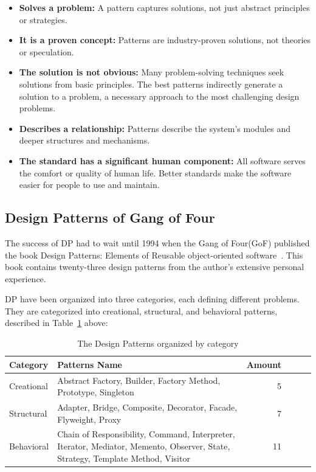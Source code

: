 \begin{itemize}
    \item \textbf{Solves a problem:} A pattern captures solutions, not just abstract principles or strategies.
    \item \textbf{It is a proven concept:} Patterns are industry-proven solutions, not theories or speculation.
    \item \textbf{The solution is not obvious:} Many problem-solving techniques seek solutions from basic principles. The best patterns indirectly generate a solution to a problem, a necessary approach to the most challenging design problems.
    \item \textbf{Describes a relationship:} Patterns describe the system's modules and deeper structures and mechanisms.
    \item \textbf{The standard has a significant human component:} All software serves the comfort or quality of human life. Better standards make the software easier for people to use and maintain. 
\end{itemize}


\subsection{Design Patterns of Gang of Four}\label{sec:gof}
The success of \ac{DP} had to wait until 1994 when the Gang of Four(GoF) published the book Design Patterns: Elements of Reusable object-oriented software~\cite{Gamma1994}. This book contains twenty-three design patterns from the author's extensive personal experience.
 
\ac{DP} have been organized into three categories, each defining different problems. They are categorized into creational, structural, and behavioral patterns, described in Table~\ref{board:pattern-category} above:

\begin{table}[ht]
    \centering
    \small     
    \caption{The Design Patterns organized by category}
    \label{board:pattern-category}
    \begin{tabular}{lp{.59\linewidth}rp{.01\linewidth}cp{.01\linewidth}} 
        \toprule
         \hline
        \rowcolor{gray!19} \textbf{Category} & \textbf{Patterns Name} & \textbf{Amount} \\
        \hline
        Creational & Abstract Factory, Builder, Factory Method, Prototype, Singleton & 5 \\
        \rowcolor{gray!19} Structural & Adapter, Bridge, Composite, Decorator, Facade, Flyweight, Proxy & 7 \\
        Behavioral & Chain of Responsibility, Command, Interpreter, Iterator, Mediator, Memento, Observer, State, Strategy, Template Method, Visitor & 11 \\ 
        \hline
        \bottomrule
    \end{tabular}
    \objectsource{\objectsourceauthor}
\end{table}

